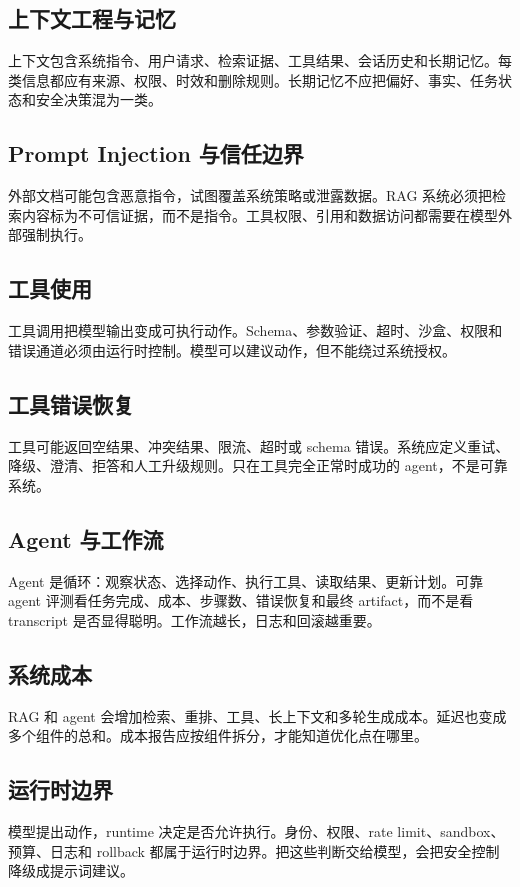 \documentclass[UTF8,zihao=-4,openany]{ctexbook}
\begin{document}
\subsection{上下文工程与记忆}
上下文包含系统指令、用户请求、检索证据、工具结果、会话历史和长期记忆。每类信息都应有来源、权限、时效和删除规则。长期记忆不应把偏好、事实、任务状态和安全决策混为一类。

\subsection{Prompt Injection 与信任边界}
外部文档可能包含恶意指令，试图覆盖系统策略或泄露数据。RAG 系统必须把检索内容标为不可信证据，而不是指令。工具权限、引用和数据访问都需要在模型外部强制执行。

\subsection{工具使用}
工具调用把模型输出变成可执行动作。Schema、参数验证、超时、沙盒、权限和错误通道必须由运行时控制。模型可以建议动作，但不能绕过系统授权。

\subsection{工具错误恢复}
工具可能返回空结果、冲突结果、限流、超时或 schema 错误。系统应定义重试、降级、澄清、拒答和人工升级规则。只在工具完全正常时成功的 agent，不是可靠系统。

\subsection{Agent 与工作流}
Agent 是循环：观察状态、选择动作、执行工具、读取结果、更新计划。可靠 agent 评测看任务完成、成本、步骤数、错误恢复和最终 artifact，而不是看 transcript 是否显得聪明。工作流越长，日志和回滚越重要。

\subsection{系统成本}
RAG 和 agent 会增加检索、重排、工具、长上下文和多轮生成成本。延迟也变成多个组件的总和。成本报告应按组件拆分，才能知道优化点在哪里。

\subsection{运行时边界}
模型提出动作，runtime 决定是否允许执行。身份、权限、rate limit、sandbox、预算、日志和 rollback 都属于运行时边界。把这些判断交给模型，会把安全控制降级成提示词建议。
\end{document}
